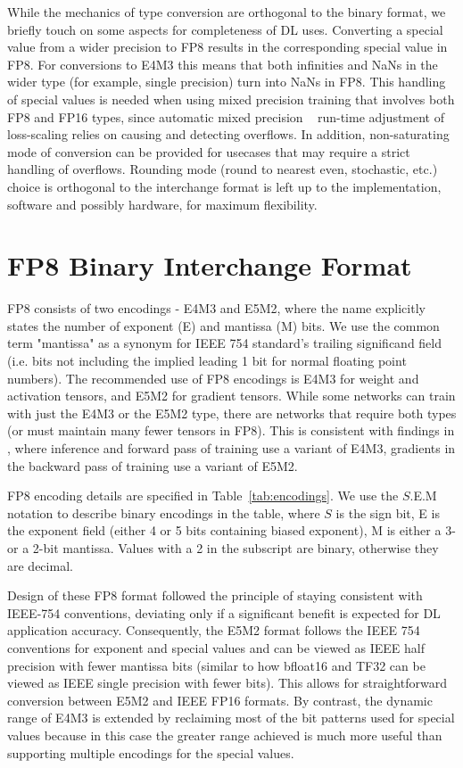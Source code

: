 While the mechanics of type conversion are orthogonal to the binary format, we briefly touch on some aspects for completeness of DL uses. Converting a special value from a wider precision to FP8 results in the corresponding special value in FP8. For conversions to E4M3 this means that both infinities and NaNs in the wider type (for example, single precision) turn into NaNs in FP8. This handling of special values is needed when using mixed precision training that involves both FP8 and FP16 types, since automatic mixed precision ~\cite{mpt_2018} run-time adjustment of loss-scaling relies on causing and detecting overflows. In addition, non-saturating mode of conversion can be provided for usecases that may require a strict handling of overflows. Rounding mode (round to nearest even, stochastic, etc.) choice is orthogonal to the interchange format is left up to the implementation, software and possibly hardware, for maximum flexibility.

\section{FP8 Binary Interchange Format}
\label{sec:fp8_types}
FP8 consists of two encodings - E4M3 and E5M2, where the name explicitly states the number of exponent (E) and mantissa (M) bits. We use the common term "mantissa" as a synonym for IEEE 754 standard's trailing significand field (i.e. bits not including the implied leading 1 bit for normal floating point numbers). The recommended use of FP8 encodings is E4M3 for weight and activation tensors, and E5M2 for gradient tensors. While some networks can train with just the E4M3 or the E5M2 type, there are networks that require both types (or must maintain many fewer tensors in FP8). This is consistent with findings in \cite{fp8_ibm_2019,fp8_gc_2022}, where inference and forward pass of training use a variant of E4M3, gradients in the backward pass of training use a variant of E5M2.

FP8 encoding details are specified in Table~\ref{tab:encodings}. We use the $S$.E.M notation to describe binary encodings in the table, where $S$ is the sign bit, E is the exponent field (either 4 or 5 bits containing biased exponent), M is either a 3- or a 2-bit mantissa. Values with a 2 in the subscript are binary, otherwise they are decimal.

Design of these FP8 format followed the principle of staying consistent with IEEE-754 conventions, deviating only if a significant benefit is expected for DL application accuracy. Consequently, the E5M2 format follows the IEEE 754 conventions for exponent and special values and can be viewed as IEEE half precision with fewer mantissa bits (similar to how bfloat16 and TF32 can be viewed as IEEE single precision with fewer bits). This allows for straightforward conversion between E5M2 and IEEE FP16 formats. By contrast, the dynamic range of E4M3 is extended by reclaiming most of the bit patterns used for special values because in this case the greater range achieved is much more useful than supporting multiple encodings for the special values.

